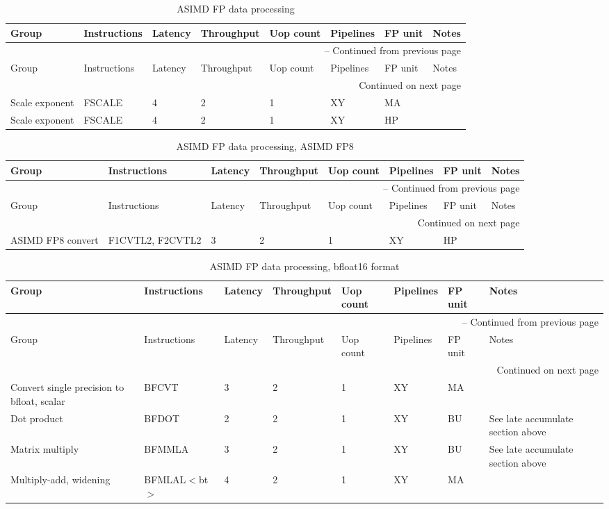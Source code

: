 \newpage
\begin{longtable}{|p{1in}|p{1in}|l|l|l|p{1in}|l|p{1in}|}
\caption{ASIMD FP data processing} \\
\hline
Group & Instructions & Latency & Throughput & Uop count & Pipelines & FP unit & Notes\\
\hline
\endfirsthead
\hline
\multicolumn{8}{|r|}{{\tablename\ \thetable{} -- Continued from previous page}} \\
\hline
Group & Instructions & Latency & Throughput & Uop count & Pipelines & FP unit & Notes\\
\hline
\endhead
\hline
\multicolumn{8}{|r|}{{Continued on next page}} \\
\hline
\endfoot
\hline
\endlastfoot
Scale exponent & FSCALE & 4 & 2 & 1 & XY & MA & \\
\hline
Scale exponent & FSCALE & 4 & 2 & 1 & XY & HP & \\
\hline
\end{longtable}
\newpage
\begin{longtable}{|p{1in}|p{1in}|l|l|l|p{1in}|l|p{1in}|}
\caption{ASIMD FP data processing, ASIMD FP8} \\
\hline
Group & Instructions & Latency & Throughput & Uop count & Pipelines & FP unit & Notes\\
\hline
\endfirsthead
\hline
\multicolumn{8}{|r|}{{\tablename\ \thetable{} -- Continued from previous page}} \\
\hline
Group & Instructions & Latency & Throughput & Uop count & Pipelines & FP unit & Notes\\
\hline
\endhead
\hline
\multicolumn{8}{|r|}{{Continued on next page}} \\
\hline
\endfoot
\hline
\endlastfoot
ASIMD FP8 convert & F1CVTL{{2}}, F2CVTL{{2}} & 3 & 2 & 1 & XY & HP & \\
\hline
\end{longtable}
\newpage
\begin{longtable}{|p{1in}|p{1in}|l|l|l|p{1in}|l|p{1in}|}
\caption{ASIMD FP data processing, bfloat16 format} \\
\hline
Group & Instructions & Latency & Throughput & Uop count & Pipelines & FP unit & Notes\\
\hline
\endfirsthead
\hline
\multicolumn{8}{|r|}{{\tablename\ \thetable{} -- Continued from previous page}} \\
\hline
Group & Instructions & Latency & Throughput & Uop count & Pipelines & FP unit & Notes\\
\hline
\endhead
\hline
\multicolumn{8}{|r|}{{Continued on next page}} \\
\hline
\endfoot
\hline
\endlastfoot
Convert single precision to bfloat, scalar & BFCVT & 3 & 2 & 1 & XY & MA & \\
\hline
Dot product & BFDOT & 2 & 2 & 1 & XY & BU & See late accumulate section above\\
\hline
Matrix multiply & BFMMLA & 3 & 2 & 1 & XY & BU & See late accumulate section above\\
\hline
Multiply-add, widening & BFMLAL$<$bt$>$ & 4 & 2 & 1 & XY & MA & \\
\hline
\end{longtable}
